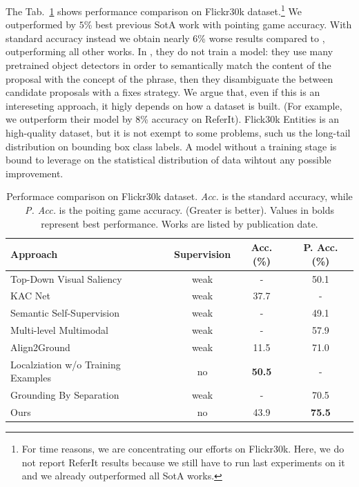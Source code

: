 \documentclass{article}
\begin{document}
The Tab.~\ref{tab:results} shows performance comparison on Flickr30k
dataset.\footnote{For time reasons, we are concentrating our efforts
on Flickr30k. Here, we do not report ReferIt results because we still
have to run last experiments on it and we already outperformed all
SotA works.} We outperformed by $5$\% best previous SotA work with
pointing game accuracy. With standard accuracy instead we obtain
nearly $6$\% worse results compared to \cite{wang2019phrase},
outperforming all other works. In \cite{wang2019phrase}, they do not
train a model: they use many pretrained object detectors in order to
semantically match the content of the proposal with the concept of the
phrase, then they disambiguate the between candidate proposals with a
fixes strategy. We argue that, even if this is an intereseting
approach, it higly depends on how a dataset is built. (For example, we
outperform their model by $8$\% accuracy on ReferIt). Flick30k
Entities is an high-quality dataset, but it is not exempt to some
problems, such us the long-tail distribution on bounding box class
labels. A model without a training stage is bound to leverage on the
statistical distribution of data wihtout any possible improvement.

\begin{table}
  \centering
  \bgroup
  \resizebox{\textwidth}{!} {%
  \begin{tabular}{lccc}
    \toprule
    \textbf{Approach} & \textbf{Supervision} & \textbf{Acc. (\%)} & \textbf{P. Acc. (\%)} \\
    \midrule
    Top-Down Visual Saliency \cite{ramanishka2017top}        & weak & -    & 50.1 \\
    KAC Net \cite{chen2018knowledge}                         & weak & 37.7 & -    \\
    Semantic Self-Supervision \cite{javed2018learning}       & weak & -    & 49.1 \\
    Multi-level Multimodal \cite{akbari2019multi}            & weak & -    & 57.9 \\
    Align2Ground \cite{datta2019align2ground}                & weak & 11.5 & 71.0 \\
    Localziation w/o Training Examples \cite{wang2019phrase} & no   & \textbf{50.5} & -    \\
    Grounding By Separation \cite{arbelle2021detector}       & weak & -    & 70.5 \\
    \midrule
    Ours                                                     & no   & 43.9 & \textbf{75.5} \\
    \bottomrule
  \end{tabular}
  }
  \egroup
  \caption{Performace comparison on Flickr30k dataset. \textit{Acc.}
  is the standard accuracy, while \textit{P. Acc.} is the poiting game
  accuracy. (Greater is better). Values in bolds represent best
  performance. Works are listed by publication date.}
  \label{tab:results}
\end{table}

\printbibliography
\end{document}
